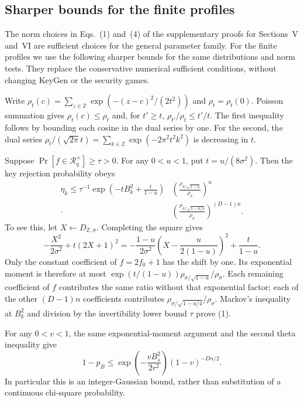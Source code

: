 \documentclass[lettersize,journal]{IEEEtran}
\begin{document}
\subsection{Sharper bounds for the finite profiles}
\label{app:tight-profile-bounds}
The norm choices in Eqs.~(1) and~(4) of the supplementary
proofs for Sections~V and~VI are sufficient choices for the
general parameter family. For the finite profiles we use the following sharper
bounds for the same distributions and norm tests. They replace the
conservative numerical sufficient conditions, without changing KeyGen or
the security games.

Write $\rho_t(c)=\sum_{z\in\mathbb Z}\exp(-(z-c)^2/(2t^2))$ and
$\rho_t=\rho_t(0)$. Poisson summation gives
$\rho_t(c)\le\rho_t$ and, for $t'\ge t$,
$\rho_{t'}/\rho_t\le t'/t$. The first inequality follows by bounding
each cosine in the dual series by one. For the second, the dual series
$\rho_t/(\sqrt{2\pi}t)=\sum_{k\in\mathbb Z}\exp(-2\pi^2t^2k^2)$
is decreasing in $t$.

Suppose $\Pr[f\in\mathcal R_q^\times]\ge\tau>0$. For any $0<u<1$,
put $t=u/(8\sigma^2)$. Then the key rejection probability obeys
\begin{equation}\label{eq:tight-key-tail}
	\begin{split}
		\eta_k\le\tau^{-1}\exp\!\left(-tB_k^2+\frac{t}{1-u}\right)
		&\left(\frac{\rho_{\sigma/\sqrt{1-u}}}{\rho_\sigma}\right)^n\\
		{}\cdot&\left(\frac{\rho_{\sigma/\sqrt{1-u/4}}}{\rho_\sigma}\right)^{(D-1)n}.
	\end{split}
\end{equation}
To see this, let $X\leftarrow D_{\mathbb Z,\sigma}$. Completing the
square gives
\[
-\frac{X^2}{2\sigma^2}+t(2X+1)^2
=-\frac{1-u}{2\sigma^2}
\left(X-\frac{u}{2(1-u)}\right)^2+\frac{t}{1-u}.
\]
Only the constant coefficient of $f=2f_0+1$ has the shift by one.
Its exponential moment is therefore at most
$\exp(t/(1-u))\rho_{\sigma/\sqrt{1-u}}/\rho_\sigma$.
Each remaining coefficient of $f$ contributes the same ratio without
that exponential factor; each of the other $(D-1)n$ coefficients
contributes $\rho_{\sigma/\sqrt{1-u/4}}/\rho_\sigma$.
Markov's inequality at $B_k^2$ and division by the invertibility lower
bound $\tau$ prove (1).

For any $0<v<1$, the same exponential-moment argument and the second
theta inequality give
\begin{equation}\label{eq:tight-response-tail}
	1-p_B\le
	\exp\!\left(-\frac{vB_s^2}{2r^2}\right)(1-v)^{-Dn/2}.
\end{equation}
In particular this is an integer-Gaussian bound, rather than substitution
of a continuous chi-square probability.
\end{document}
